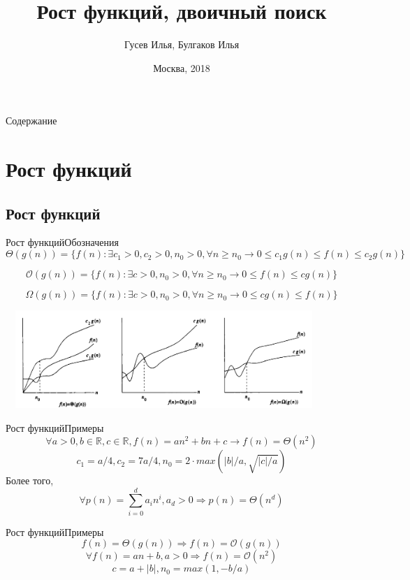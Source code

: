 \documentclass[10pt]{beamer}
\title[\href{https://goo.gl/NRgp8K}{https://goo.gl/NRgp8K} (Term 1)]{Рост функций, двоичный поиск}
\author[Гусев Илья, Булгаков Илья]{Гусев Илья, Булгаков Илья}
\institute[МФТИ] 
{Московский физико-технический институт\\*}
\date{Москва, 2018}
\begin{document}
\begin{frame}
  \titlepage
\end{frame}

\begin{frame}{Содержание}
\tableofcontents
\end{frame}

\section{Рост функций}
\subsection{Рост функций}
\begin{frame}[fragile]{Рост функций}{Обозначения}
\[\Theta(g(n)) = \{f(n): \exists c_1 > 0, c_2 > 0, n_0 > 0, \forall n \geq n_0 \rightarrow 0 \leq c_1g(n) \leq f(n) \leq c_2 g(n)\} \]

\[\mathcal{O}(g(n)) = \{f(n): \exists c > 0, n_0 > 0, \forall n \geq n_0 \rightarrow 0 \leq f(n) \leq  cg(n) \} \]

\[\Omega(g(n)) = \{f(n): \exists c > 0, n_0 > 0, \forall n \geq n_0 \rightarrow 0 \leq cg(n) \leq f(n) \} \]

\includegraphics[width=12cm, height=3.7cm]{Term_1/Source/Pirctures/notations.png}
\end{frame}

\begin{frame}[fragile]{Рост функций}{Примеры}
\[\forall a > 0, b \in \mathbb{R}, c \in \mathbb{R}, f(n) = an^2 + bn + c  \rightarrow f(n) = \Theta(n^2)\]
\[c_1 = a / 4, c_2 = 7a/4, n_0 = 2 \cdot max(|b|/a, \sqrt{|c|/a})\]
Более того, 
\[\forall p(n) = \sum_{i=0}^{d} a_i n^i, a_d > 0 \Rightarrow p(n) = \Theta(n^d)\]
\end{frame}

\begin{frame}[fragile]{Рост функций}{Примеры}
\[f(n) = \Theta(g(n)) \Rightarrow f(n) = \mathcal{O}(g(n))\]
\[\forall f(n) = an + b, a > 0 \Rightarrow f(n) = \mathcal{O}(n^2)\]
\[c = a + |b|, n_0 = max(1, -b/a)\]
\end{frame}
\end{document}
